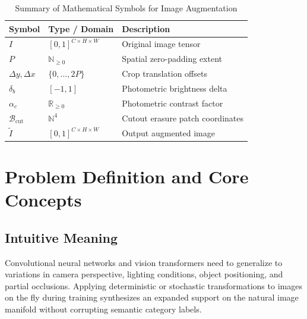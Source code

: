 \documentclass[11pt,a4paper]{article}
\theoremstyle{definition}
\begin{document}
\begin{table}[h]
\centering
\caption{Summary of Mathematical Symbols for Image Augmentation}
\begin{tabular}{lll}
\toprule
\textbf{Symbol} & \textbf{Type / Domain} & \textbf{Description} \\
\midrule
$I$ & $[0, 1]^{C \times H \times W}$ & Original image tensor \\
$P$ & $\mathbb{N}_{\ge 0}$ & Spatial zero-padding extent \\
$\Delta y, \Delta x$ & $\{0, \dots, 2P\}$ & Crop translation offsets \\
$\delta_b$ & $[-1, 1]$ & Photometric brightness delta \\
$\alpha_c$ & $\mathbb{R}_{\ge 0}$ & Photometric contrast factor \\
$\mathcal{B}_{\text{cut}}$ & $\mathbb{N}^4$ & Cutout erasure patch coordinates \\
$\tilde{I}$ & $[0, 1]^{C \times H \times W}$ & Output augmented image \\
\bottomrule
\end{tabular}
\end{table}

\section{Problem Definition and Core Concepts}

\subsection{Intuitive Meaning}
Convolutional neural networks and vision transformers need to generalize to variations in camera perspective, lighting conditions, object positioning, and partial occlusions. Applying deterministic or stochastic transformations to images on the fly during training synthesizes an expanded support on the natural image manifold without corrupting semantic category labels.
\end{document}

